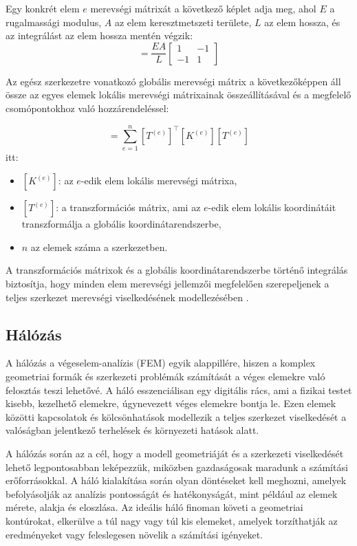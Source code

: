 \documentclass[12pt,a4paper,oneside]{report}
\begin{document}
Egy konkrét elem $e$ merevségi mátrixát a következő képlet adja meg, ahol $E$ a rugalmassági modulus, $A$ az elem keresztmetszeti területe, $L$ az elem hossza, és az integrálást az elem hossza mentén végzik:
\begin{equation}
    [K^{(e)}] = \frac{E A}{L}
    \begin{bmatrix}
        1   &   -1 \\
        -1  &   1 
    \end{bmatrix}
\end{equation}

Az egész szerkezetre vonatkozó globális merevségi mátrix a következőképpen áll össze az egyes elemek lokális merevségi mátrixainak összeállításával és a megfelelő csomópontokhoz való hozzárendeléssel:

\begin{equation}
    [K_{\text{global}}] = \sum_{e=1}^{n} [T^{(e)}]^\top [K^{(e)}] [T^{(e)}]
\end{equation}
itt:
\begin{itemize}
    \item $[K^{(e)}]$: az $e$-edik elem lokális merevségi mátrixa,
    \item $[T^{(e)}]$: a transzformációs mátrix, ami az $e$-edik elem lokális koordinátáit transzformálja a globális koordinátarendszerbe,
    \item $n$ az elemek száma a szerkezetben.
\end{itemize}

A transzformációs mátrixok és a globális koordinátarendszerbe történő integrálás biztosítja, hogy minden elem merevségi jellemzői megfelelően szerepeljenek a teljes szerkezet merevségi viselkedésének modellezésében \citep{voros2012veges,paczelt2007veges,VEM2011}.

\subsection{Hálózás}
A hálózás a végeselem-analízis (FEM) egyik alappillére, hiszen a komplex geometriai formák és szerkezeti problémák számítását a véges elemekre való felosztás teszi lehetővé. A háló esszenciálisan egy digitális rács, ami a fizikai testet kisebb, kezelhető elemekre, úgynevezett véges elemekre bontja le. Ezen elemek közötti kapcsolatok és kölcsönhatások modellezik a teljes szerkezet viselkedését a valóságban jelentkező terhelések és környezeti hatások alatt.

A hálózás során az a cél, hogy a modell geometriáját és a szerkezeti viselkedését lehető legpontosabban leképezzük, miközben gazdaságosak maradunk a számítási erőforrásokkal. A háló kialakítása során olyan döntéseket kell meghozni, amelyek befolyásolják az analízis pontosságát és hatékonyságát, mint például az elemek mérete, alakja és eloszlása. Az ideális háló finoman követi a geometriai kontúrokat, elkerülve a túl nagy vagy túl kis elemeket, amelyek torzíthatják az eredményeket vagy feleslegesen növelik a számítási igényeket.
\end{document}
